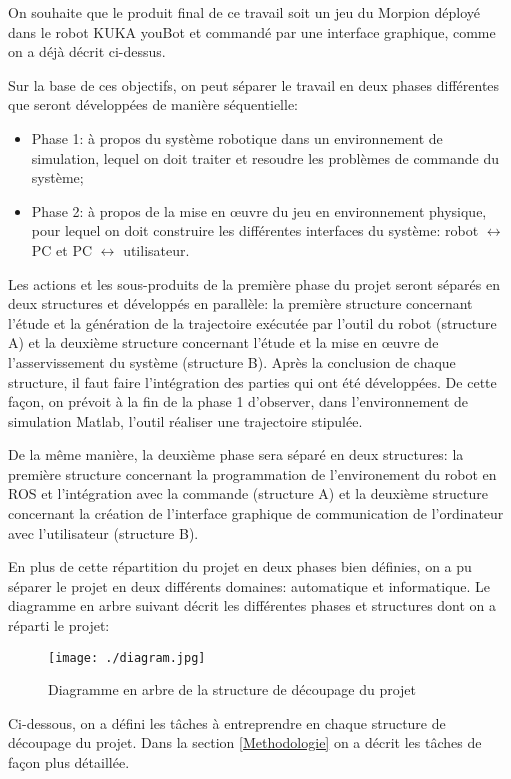 \label{Div_Trav}

On souhaite que le produit final de ce travail soit un jeu du Morpion déployé dans le robot KUKA youBot et commandé par une interface graphique, comme on a déjà décrit ci-dessus. 

Sur la base de ces objectifs, on peut séparer le travail en deux phases différentes que seront développées de manière séquentielle:
\begin{itemize}
	\item Phase 1: à propos du système robotique dans un environnement de simulation, lequel on doit traiter et resoudre les problèmes de commande du système;
	\item Phase 2: à propos de la mise en \oe{}uvre du jeu en environnement physique, pour lequel on doit construire les différentes interfaces du système: robot $ \leftrightarrow $ PC et PC $ \leftrightarrow $ utilisateur.
\end{itemize}


Les actions et les sous-produits de la première phase du projet seront séparés en deux structures et développés en parallèle: la première structure concernant l’étude et la génération de la trajectoire exécutée par l’outil du robot (structure A) et la deuxième structure concernant l’étude et la mise en \oe{}uvre de l’asservissement du système (structure B). Après la conclusion de chaque structure, il faut faire l’intégration des parties qui ont été développées. De cette façon, on prévoit à la fin de la phase 1 d'observer, dans l’environnement de simulation Matlab, l’outil réaliser une trajectoire stipulée. 

De la même manière, la deuxième phase sera séparé en deux structures: la première structure concernant la programmation de l'environement du robot en ROS et l'intégration avec la commande (structure A) et la deuxième structure concernant la création de l’interface graphique de communication de l’ordinateur avec l’utilisateur (structure B).

En plus de cette répartition du projet en deux phases bien définies, on a pu séparer le projet en deux différents domaines: automatique et informatique. Le diagramme en arbre suivant décrit les différentes phases et structures dont on a réparti le projet:


\begin{figure}[H]
	\begin{center}	
		\texttt{[image: ./diagram.jpg]}
		\caption{Diagramme en arbre de la structure de découpage du projet }
		\label{fig:diagram}
	\end{center}
\end{figure}


Ci-dessous, on a défini les tâches à entreprendre en chaque structure de découpage du projet. Dans la section \ref{Methodologie} on a décrit les tâches de façon plus détaillée.
\newpage
